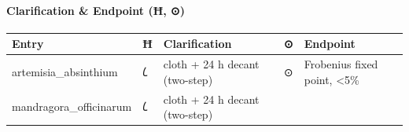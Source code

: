 \documentclass[12pt,a4paper]{article}
\begin{document}
\hypertarget{clarification-endpoint-ux127}{%
\paragraph{Clarification \& Endpoint (Ħ,
⊙)}\label{clarification-endpoint-ux127}}

\begin{longtable}[]{@{}lllll@{}}
\toprule
\begin{minipage}[b]{0.17\columnwidth}\raggedright
Entry\strut
\end{minipage} & \begin{minipage}[b]{0.17\columnwidth}\raggedright
Ħ\strut
\end{minipage} & \begin{minipage}[b]{0.17\columnwidth}\raggedright
Clarification\strut
\end{minipage} & \begin{minipage}[b]{0.17\columnwidth}\raggedright
⊙\strut
\end{minipage} & \begin{minipage}[b]{0.17\columnwidth}\raggedright
Endpoint\strut
\end{minipage}\tabularnewline
\midrule
\endhead
\begin{minipage}[t]{0.17\columnwidth}\raggedright
artemisia\_absinthium\strut
\end{minipage} & \begin{minipage}[t]{0.17\columnwidth}\raggedright
𐑖\strut
\end{minipage} & \begin{minipage}[t]{0.17\columnwidth}\raggedright
cloth + 24 h decant (two-step)\strut
\end{minipage} & \begin{minipage}[t]{0.17\columnwidth}\raggedright
⊙\strut
\end{minipage} & \begin{minipage}[t]{0.17\columnwidth}\raggedright
Frobenius fixed point, \textless5\%\strut
\end{minipage}\tabularnewline
\begin{minipage}[t]{0.17\columnwidth}\raggedright
mandragora\_officinarum\strut
\end{minipage} & \begin{minipage}[t]{0.17\columnwidth}\raggedright
𐑖\strut
\end{minipage} & \begin{minipage}[t]{0.17\columnwidth}\raggedright
cloth + 24 h decant (two-step)\strut
\end{minipage} & \begin{minipage}[t]{0.17\columnwidth}\raggedright

\end{minipage}
\end{longtable}
\end{document}
